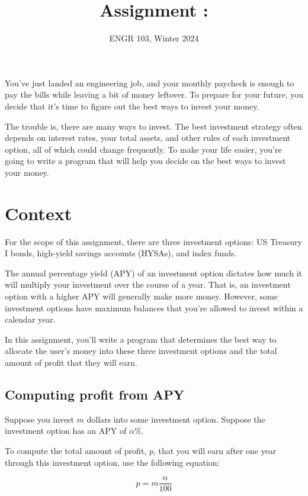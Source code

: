 \documentclass{article}
\title{
    Assignment \assignmentnumber: \assignmenttitle
}
\author{ENGR 103, Winter 2024}
\date{}
\begin{document}
\maketitle

You've just landed an engineering job, and your monthly paycheck is enough to pay the bills while leaving a bit of money leftover. To prepare for your future, you decide that it's time to figure out the best ways to invest your money.

The trouble is, there are many ways to invest. The best investment strategy often depends on interest rates, your total assets, and other rules of each investment option, all of which could change frequently. To make your life easier, you're going to write a program that will help you decide on the best ways to invest your money.

\section{Context}

For the scope of this assignment, there are three investment options: US Treasury I bonds, high-yield savings accounts (HYSAs), and index funds.

The annual percentage yield (APY) of an investment option dictates how much it will multiply your investment over the course of a year. That is, an investment option with a higher APY will generally make more money. However, some investment options have maximum balances that you're allowed to invest within a calendar year.

In this assignment, you'll write a program that determines the best way to allocate the user's money into these three investment options and the total amount of profit that they will earn.

\subsection{Computing profit from APY}

Suppose you invest $m$ dollars into some investment option. Suppose the investment option has an APY of $\alpha\%$.

To compute the total amount of profit, $p$, that you will earn after one year through this investment option, use the following equation:

\begin{equation}
\label{eq:profit}
p = m \frac{\alpha}{100}
\end{equation}
\end{document}
